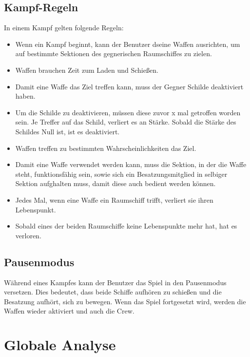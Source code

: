 \documentclass[fontsize=12pt,paper=a4,twoside]{scrartcl}
\begin{document}
\subsection{Kampf-Regeln}
In einem Kampf gelten folgende Regeln:
\begin{itemize}
\item Wenn ein Kampf beginnt, kann der Benutzer dseine Waffen ausrichten, um auf  bestimmte Sektionen des gegnerischen Raumschiffes zu zielen.
 
\item Waffen brauchen Zeit zum Laden und Schießen.

\item Damit eine Waffe das Ziel treffen kann, muss der Gegner Schilde deaktiviert haben.

\item Um die Schilde zu deaktivieren, müssen diese zuvor x mal getroffen worden sein. Je Treffer auf das Schild,  verliert es an Stärke. Sobald die Stärke des Schildes Null ist, ist es deaktiviert.

\item Waffen treffen zu bestimmten Wahrscheinlichkeiten  das Ziel.

\item Damit eine Waffe verwendet werden kann, muss die Sektion, in der die Waffe steht, funktionsfähig sein, sowie sich ein Besatzungsmitglied in selbiger Sektion aufghalten muss, damit diese auch bedient werden können.

\item Jedes Mal, wenn eine Waffe ein Raumschiff trifft, verliert sie ihren Lebenspunkt.

\item Sobald eines der beiden Raumschiffe keine Lebenspunkte mehr hat, hat es verloren.
\end{itemize}
\subsection{Pausenmodus}
Während eines Kampfes kann der Benutzer das Spiel in den Pausenmodus versetzen. Dies bedeutet, dass beide Schiffe aufhören zu schießen und die Besatzung aufhört, sich zu bewegen. Wenn das Spiel fortgesetzt wird, werden die Waffen wieder aktiviert und auch die Crew.
\newpage
\section{Globale Analyse} \label{sec:globale_analyse}
\end{document}
